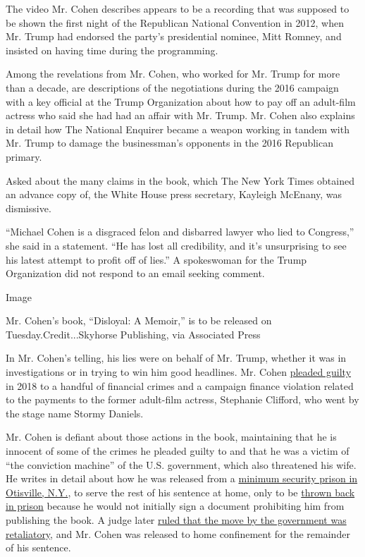 The video Mr. Cohen describes appears to be a recording that was
supposed to be shown the first night of the Republican National
Convention in 2012, when Mr. Trump had endorsed the party's presidential
nominee, Mitt Romney, and insisted on having time during the
programming.

Among the revelations from Mr. Cohen, who worked for Mr. Trump for more
than a decade, are descriptions of the negotiations during the 2016
campaign with a key official at the Trump Organization about how to pay
off an adult-film actress who said she had had an affair with Mr. Trump.
Mr. Cohen also explains in detail how The National Enquirer became a
weapon working in tandem with Mr. Trump to damage the businessman's
opponents in the 2016 Republican primary.

Asked about the many claims in the book, which The New York Times
obtained an advance copy of, the White House press secretary, Kayleigh
McEnany, was dismissive.

﻿``Michael Cohen is a disgraced felon and disbarred lawyer who lied to
Congress,'' she said in a statement. ``He has lost all credibility, and
it's unsurprising to see his latest attempt to profit off of lies.'' A
spokeswoman for the Trump Organization did not respond to an email
seeking comment.

Image

Mr. Cohen's book, ``Disloyal: A Memoir,'' is to be released on
Tuesday.Credit...Skyhorse Publishing, via Associated Press

In Mr. Cohen's telling, his lies were on behalf of Mr. Trump, whether it
was in investigations or in trying to win him good headlines. Mr. Cohen
\href{https://www.nytimes3xbfgragh.onion/2018/08/21/nyregion/michael-cohen-plea-deal-trump.html}{pleaded
guilty} in 2018 to a handful of financial crimes and a campaign finance
violation related to the payments to the former adult-film actress,
Stephanie Clifford, who went by the stage name Stormy Daniels.

Mr. Cohen is defiant about those actions in the book, maintaining that
he is innocent of some of the crimes he pleaded guilty to and that he
was a victim of ``the conviction machine'' of the U.S. government, which
also threatened his wife. He writes in detail about how he was released
from a
\href{https://www.nytimes3xbfgragh.onion/2019/01/22/nyregion/michael-cohen-otisville-prison.html}{minimum
security prison in Otisville, N.Y.}, to serve the rest of his sentence
at home, only to be
\href{https://www.nytimes3xbfgragh.onion/2020/07/09/nyregion/michael-cohen-arrested.html}{thrown
back in prison} because he would not initially sign a document
prohibiting him from publishing the book. A judge later
\href{https://www.nytimes3xbfgragh.onion/2020/07/23/nyregion/michael-cohen-trump-book.html}{ruled
that the move by the government was retaliatory}, and Mr. Cohen was
released to home confinement for the remainder of his sentence.

